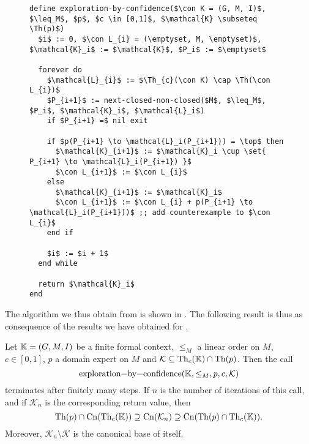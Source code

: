 \begin{figure}[tp]
  \centering
  \begin{Algorithm}
    \label{alg:exploration-by-confidence-first-version}
    \hspace*{0cm}
\begin{lstlisting}
define exploration-by-confidence($\con K = (G, M, I)$, $\leq_M$, $p$, $c \in [0,1]$, $\mathcal{K} \subseteq \Th(p)$)
  $i$ := 0, $\con L_{i} = (\emptyset, M, \emptyset)$, $\mathcal{K}_i$ := $\mathcal{K}$, $P_i$ := $\emptyset$

  forever do
    $\mathcal{L}_{i}$ := $\Th_{c}(\con K) \cap \Th(\con L_{i})$
    $P_{i+1}$ := next-closed-non-closed($M$, $\leq_M$, $P_i$, $\mathcal{K}_i$, $\mathcal{L}_i$)
    if $P_{i+1} =$ nil exit

    if $p(P_{i+1} \to \mathcal{L}_i(P_{i+1})) = \top$ then
      $\mathcal{K}_{i+1}$ := $\mathcal{K}_i \cup \set{ P_{i+1} \to \mathcal{L}_i(P_{i+1}) }$
      $\con L_{i+1}$ := $\con L_{i}$
    else
      $\mathcal{K}_{i+1}$ := $\mathcal{K}_i$
      $\con L_{i+1}$ := $\con L_{i} + p(P_{i+1} \to \mathcal{L}_i(P_{i+1}))$ ;; add counterexample to $\con L_{i}$
    end if

    $i$ := $i + 1$
  end while

  return $\mathcal{K}_i$  
end
\end{lstlisting}
  \end{Algorithm}
\end{figure}

The algorithm we thus obtain from  is shown in
.  The following result is thus as
consequence of the results we have obtained for .

\begin{Corollary}
  \label{cor:exploration-by-confidence-first-version}
  Let ${\mathbb{K}} = (G, M, I)$ be a finite formal context, $\leq_{M}$ a linear order on $M$,
  $c \in [0,1]$, $p$ a domain expert on $M$ and $\mathcal{K} \subseteq \operatorname{Th}_{c}({\mathbb{K}})
  \cap \operatorname{Th}(p)$.  Then the call
  \begin{equation*}
    \text{\lstinline{exploration-by-confidence}}(\con K, \leq_{M}, p, c, \mathcal{K})
  \end{equation*}
  terminates after finitely many steps.  If $n$ is the number of iterations of this call,
  and if $\mathcal{K}_{n}$ is the corresponding return value, then
  \begin{equation*}
    \operatorname{Th}(p) \cap \operatorname{Cn}(\operatorname{Th}_{c}({\mathbb{K}})) \supseteq \operatorname{Cn}(\mathcal{K}_{n}) \supseteq \operatorname{Cn}(\operatorname{Th}(p)
    \cap \operatorname{Th}_{c}({\mathbb{K}})).
  \end{equation*}
  Moreover, $\mathcal{K}_{n} \setminus \mathcal{K}$ is the canonical base of itself.
\end{Corollary}

